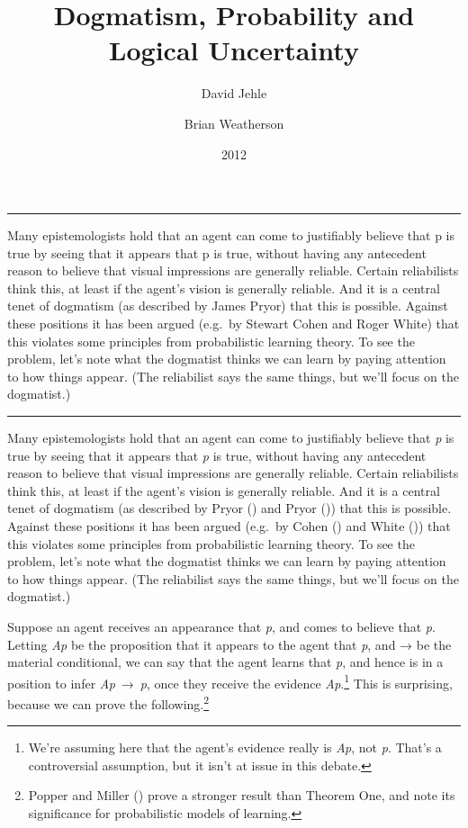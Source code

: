 \documentclass[
  10pt,
  letterpaper,
  DIV=11,
  numbers=noendperiod,
  twoside]{scrartcl}
\title{Dogmatism, Probability and Logical Uncertainty}
\author{David Jehle \and Brian Weatherson}
\date{2012}
\renewenvironment{abstract}
 {\vspace{-1.25cm}
 \quotation\small\noindent\rule{\linewidth}{.5pt}\par\smallskip
 \noindent }
 {\par\noindent\rule{\linewidth}{.5pt}\endquotation}
\begin{document}
\maketitle
\begin{abstract}
Many epistemologists hold that an agent can come to justifiably believe
that p is true by seeing that it appears that p is true, without having
any antecedent reason to believe that visual impressions are generally
reliable. Certain reliabilists think this, at least if the agent's
vision is generally reliable. And it is a central tenet of dogmatism (as
described by James Pryor) that this is possible. Against these positions
it has been argued (e.g.~by Stewart Cohen and Roger White) that this
violates some principles from probabilistic learning theory. To see the
problem, let's note what the dogmatist thinks we can learn by paying
attention to how things appear. (The reliabilist says the same things,
but we'll focus on the dogmatist.)
\end{abstract}

Many epistemologists hold that an agent can come to justifiably believe
that \emph{p} is true by seeing that it appears that \emph{p} is true,
without having any antecedent reason to believe that visual impressions
are generally reliable. Certain reliabilists think this, at least if the
agent's vision is generally reliable. And it is a central tenet of
dogmatism (as described by Pryor () and
Pryor ()) that this is possible. Against
these positions it has been argued (e.g.~by Cohen
() and White
()) that this violates some principles
from probabilistic learning theory. To see the problem, let's note what
the dogmatist thinks we can learn by paying attention to how things
appear. (The reliabilist says the same things, but we'll focus on the
dogmatist.)

Suppose an agent receives an appearance that \emph{p}, and comes to
believe that \emph{p}. Letting \emph{Ap} be the proposition that it
appears to the agent that \emph{p}, and → be the material conditional,
we can say that the agent learns that \emph{p}, and hence is in a
position to infer \emph{Ap}~→~\emph{p}, once they receive the evidence
\emph{Ap}.\footnote{We're assuming here that the agent's evidence really
  is \emph{Ap}, not \emph{p}. That's a controversial assumption, but it
  isn't at issue in this debate.} This is surprising, because we can
prove the following.\footnote{Popper and Miller
  () prove a stronger result than
  Theorem One, and note its significance for probabilistic models of
  learning.}
\end{document}
